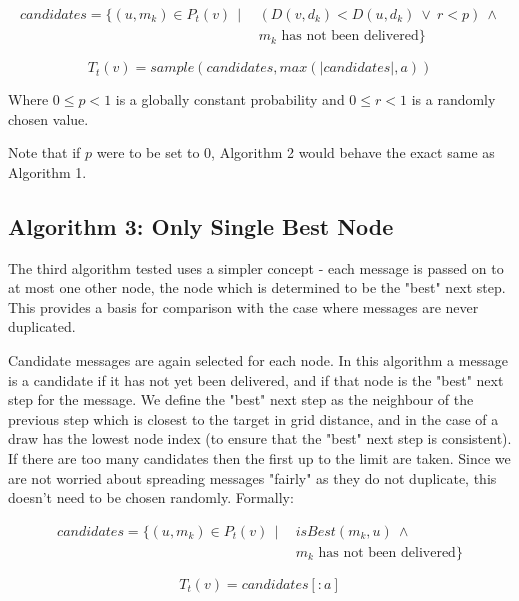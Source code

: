 \documentclass[bsc,frontabs,twoside,singlespacing,parskip,deptreport]{infthesis}     %
\begin{document}
\begin{equation}
\begin{split}
candidates = \{ (u, m_{k}) \in P_{t}(v) \:\: | \:\: & (D(v, d_{k}) < D(u, d_{k}) \: \vee \: r < p) \: \wedge \\
& m_{k} \mbox{ has not been delivered} \}
\end{split}
\end{equation}

\begin{equation}
T_{t}(v) = sample(candidates, max(|candidates|, a))
\end{equation}

Where $0 \leq p < 1$ is a globally constant probability and $0 \leq r < 1$ is a randomly chosen value.

Note that if $p$ were to be set to 0, Algorithm 2 would behave the exact same as Algorithm 1.

\subsection{Algorithm 3: Only Single Best Node}
The third algorithm tested uses a simpler concept - each message is passed on to at most one other node, the node which is determined to be the "best" next step. This provides a basis for comparison with the case where messages are never duplicated.

Candidate messages are again selected for each node. In this algorithm a message is a candidate if it has not yet been delivered, and if that node is the "best" next step for the message. We define the "best" next step as the neighbour of the previous step which is closest to the target in grid distance, and in the case of a draw has the lowest node index (to ensure that the "best" next step is consistent). If there are too many candidates then the first up to the limit are taken. Since we are not worried about spreading messages "fairly" as they do not duplicate, this doesn't need to be chosen randomly. Formally:

\begin{equation}
\begin{split}
candidates = \{ (u, m_{k}) \in P_{t}(v) \:\: | \:\: & isBest(m_{k}, u) \: \wedge \\
& m_{k} \mbox{ has not been delivered} \}
\end{split}
\end{equation}

\begin{equation}
T_{t}(v) = candidates[:a]
\end{equation}
\end{document}
